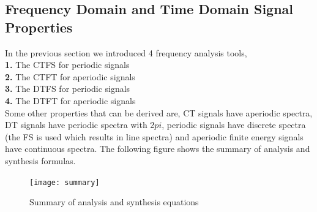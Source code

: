 \documentclass{article} %
\begin{document}
	\subsection{Frequency Domain and Time Domain Signal Properties}
	In the previous section we introduced 4 frequency analysis tools,\\
	\textbf{1.} The CTFS for periodic signals\\
	\textbf{2.} The CTFT for aperiodic signals\\
	\textbf{3.} The DTFS for periodic signals\\
	\textbf{4.} The DTFT for aperiodic signals\\
	Some other properties that can be derived are, CT signals have aperiodic spectra, DT signals have periodic spectra with 2$pi$, 
	periodic signals have discrete spectra (the FS is used which results in line spectra) and aperiodic finite energy signals have 
	continuous spectra. The following figure shows the summary of analysis and synthesis formulas. 
	\begin{figure}[h]
	\centering
	\texttt{[image: summary]}
	\caption{Summary of analysis and synthesis equations}
	\end{figure}
\end{document}
